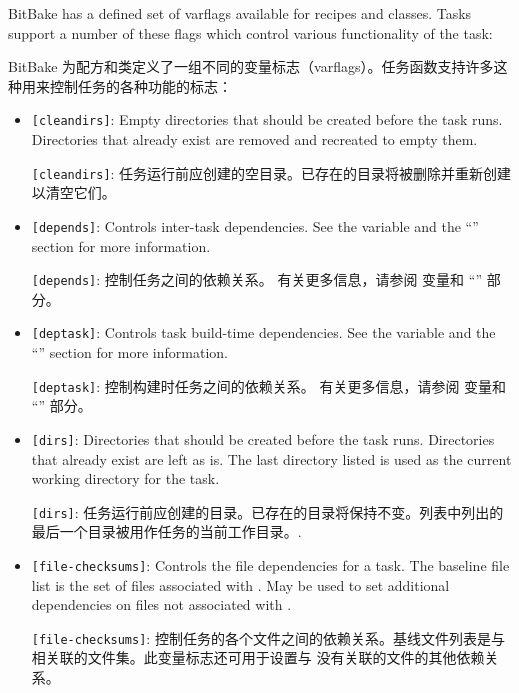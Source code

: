 BitBake has a defined set of varflags available for recipes and classes. Tasks support a number of these flags which control various functionality of the task:

BitBake 为配方和类定义了一组不同的变量标志（varflags）。任务函数支持许多这种用来控制任务的各种功能的标志：

\begin{itemize}
\setlength\itemsep{1.0em}
\item \texttt{[cleandirs]}: Empty directories that should be created before the task runs. Directories that already exist are removed and recreated to empty them.

\medskip
\texttt{[cleandirs]}: 任务运行前应创建的空目录。已存在的目录将被删除并重新创建以清空它们。

\item \texttt{[depends]}: Controls inter-task dependencies. See the  variable and the ``'' section for more information.

\medskip
\texttt{[depends]}: 控制任务之间的依赖关系。 有关更多信息，请参阅  变量和 ``'' 部分。

\item \texttt{[deptask]}: Controls task build-time dependencies. See the  variable and the ``'' section for more information.

\medskip
\texttt{[deptask]}: 控制构建时任务之间的依赖关系。 有关更多信息，请参阅  变量和 ``'' 部分。

\item \texttt{[dirs]}: Directories that should be created before the task runs. Directories that already exist are left as is. The last directory listed is used as the current working directory for the task.

\medskip
\texttt{[dirs]}: 任务运行前应创建的目录。已存在的目录将保持不变。列表中列出的最后一个目录被用作任务的当前工作目录。.

\item \texttt{[file-checksums]}: Controls the file dependencies for a task. The baseline file list is the set of files associated with . May be used to set additional dependencies on files not associated with .

\medskip
\texttt{[file-checksums]}: 控制任务的各个文件之间的依赖关系。基线文件列表是与  相关联的文件集。此变量标志还可用于设置与  没有关联的文件的其他依赖关系。


\end{itemize}
